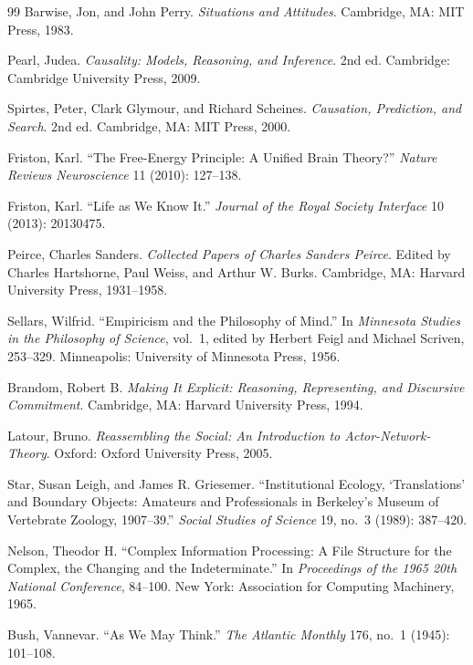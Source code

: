 \documentclass[
  11pt,
  a4paper,
  DIV=12,
  BCOR=0mm,
  parskip=half-
]{scrartcl}
\theoremstyle{definition}
\theoremstyle{plain}
\theoremstyle{remark}
\begin{document}
\begin{thebibliography}{99}
Barwise, Jon, and John Perry.
\emph{Situations and Attitudes}.
Cambridge, MA: MIT Press, 1983.

Pearl, Judea.
\emph{Causality: Models, Reasoning, and Inference}.
2nd ed.
Cambridge: Cambridge University Press, 2009.

Spirtes, Peter, Clark Glymour, and Richard Scheines.
\emph{Causation, Prediction, and Search}.
2nd ed.
Cambridge, MA: MIT Press, 2000.

Friston, Karl.
``The Free-Energy Principle: A Unified Brain Theory?''
\emph{Nature Reviews Neuroscience}
11 (2010): 127--138.

Friston, Karl.
``Life as We Know It.''
\emph{Journal of the Royal Society Interface}
10 (2013): 20130475.

Peirce, Charles Sanders.
\emph{Collected Papers of Charles Sanders Peirce}.
Edited by Charles Hartshorne, Paul Weiss, and Arthur W. Burks.
Cambridge, MA: Harvard University Press, 1931--1958.

Sellars, Wilfrid.
``Empiricism and the Philosophy of Mind.''
In \emph{Minnesota Studies in the Philosophy of Science}, vol.~1,
edited by Herbert Feigl and Michael Scriven, 253--329.
Minneapolis: University of Minnesota Press, 1956.

Brandom, Robert B.
\emph{Making It Explicit: Reasoning, Representing, and Discursive
Commitment}.
Cambridge, MA: Harvard University Press, 1994.

Latour, Bruno.
\emph{Reassembling the Social: An Introduction to Actor-Network-Theory}.
Oxford: Oxford University Press, 2005.

Star, Susan Leigh, and James R. Griesemer.
``Institutional Ecology, `Translations' and Boundary Objects: Amateurs and
Professionals in Berkeley's Museum of Vertebrate Zoology, 1907--39.''
\emph{Social Studies of Science}
19, no.~3 (1989): 387--420.

Nelson, Theodor H.
``Complex Information Processing: A File Structure for the Complex, the
Changing and the Indeterminate.''
In \emph{Proceedings of the 1965 20th National Conference},
84--100.
New York: Association for Computing Machinery, 1965.

Bush, Vannevar.
``As We May Think.''
\emph{The Atlantic Monthly}
176, no.~1 (1945): 101--108.


\end{thebibliography}
\end{document}
